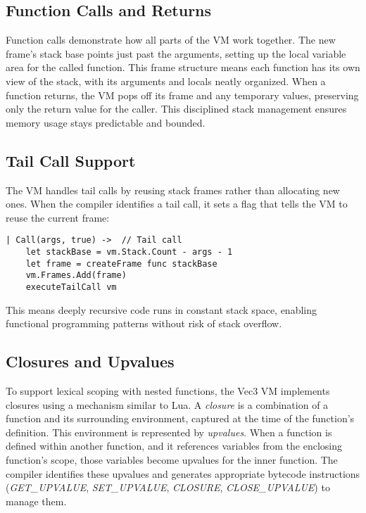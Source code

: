 \subsection{Function Calls and Returns}\label{subsec:function-calls-and-returns}

Function calls demonstrate how all parts of the VM work together.
The new frame's stack base points just past the arguments, setting up the local variable area for the called function. 
This frame structure means each function has its own view of the stack, with its arguments and locals neatly organized.
When a function returns, the VM pops off its frame and any temporary values, preserving only the return value for the caller.
This disciplined stack management ensures memory usage stays predictable and bounded.

\subsection{Tail Call Support}\label{subsec:tail-call-support}

The VM handles tail calls by reusing stack frames rather than allocating new ones.
When the compiler identifies a tail call, it sets a flag that tells the VM to reuse the current frame:

\begin{verbatim}
| Call(args, true) ->  // Tail call
    let stackBase = vm.Stack.Count - args - 1
    let frame = createFrame func stackBase
    vm.Frames.Add(frame)
    executeTailCall vm
\end{verbatim}
This means deeply recursive code runs in constant stack space, enabling functional programming patterns without risk of stack overflow.

\subsection{Closures and Upvalues}\label{subsec:closures-and-upvalues}
To support lexical scoping with nested functions, the Vec3 VM implements closures using a mechanism similar to Lua.
A \textit{closure} is a combination of a function and its surrounding environment, captured at the time of the function's definition.
This environment is represented by \textit{upvalues}.
When a function is defined within another function, and it references variables from the enclosing function's scope, those variables become upvalues for the inner function.
 The compiler identifies these upvalues and generates appropriate bytecode instructions (\textit{GET\_UPVALUE}, 
\textit{SET\_UPVALUE}, \textit{CLOSURE}, \textit{CLOSE\_UPVALUE}) to manage them.

